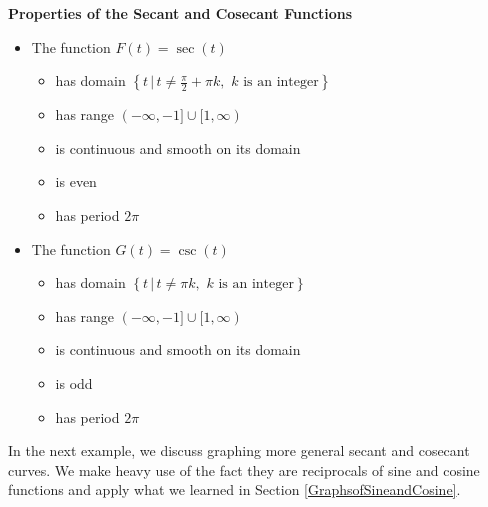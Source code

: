 \documentclass{ximera}
\begin{document}
\begin{theorem} \label{secantcosecantfunctionprops}  \textbf{Properties of the Secant and Cosecant Functions}  

\begin{itemize}

\item  The function $F(t) = \sec(t)$

\begin{itemize}


\item has domain $\left\{ t \, | \, t \neq \frac{\pi}{2} + \pi k, \, \,  \text{$k$ is an integer} \right\}$

\item has range $(-\infty, -1] \cup [1, \infty)$

\item  is continuous and smooth on its domain

\item is even

\item has period $2\pi$

\end{itemize}

\item  The function $G(t) = \csc(t)$

\begin{itemize}

\item has domain $\left\{ t \, | \,  t \neq \pi  k, \, \,  \text{$k$ is an integer} \right\}$

\item has range $(-\infty, -1] \cup [1, \infty)$

\item  is continuous and smooth on its domain

\item is odd

\item has period $2\pi$

\end{itemize}

\end{itemize}



\end{theorem}





In the next example, we discuss graphing more general secant and cosecant curves.  We make heavy use of the fact they are reciprocals of sine and cosine functions and apply what we learned in Section \ref{GraphsofSineandCosine}.
  
\end{document}

